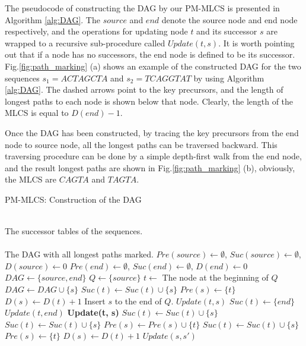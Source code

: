 \documentclass{article}
\begin{document}
The pseudocode of constructing the DAG by our PM-MLCS is presented in
Algorithm \ref{alg:DAG}. The $source$ and $end$ denote the source node
and end node respectively, and the operations for updating node $t$
and its successor $s$ are wrapped to a recursive sub-procedure called
$Update(t, s)$. It is worth pointing out that if a node has no
successors, the end node is defined to be its
successor. Fig.\ref{fig:path_marking} (a) shows an example of the
constructed DAG for the two sequences $s_1 = ACTAGCTA$ and $s_2 =
TCAGGTAT$ by using Algorithm \ref{alg:DAG}. The dashed arrows point to
the key precursors, and the length of longest paths to each node is
shown below that node. Clearly, the length of the MLCS is equal to
$D(end)-1$.

Once the DAG has been constructed, by tracing the key precursors from
the end node to source node, all the longest paths can be traversed
backward. This traversing procedure can be done by a simple
depth-first walk from the end node, and the result longest paths are
shown in Fig.\ref{fig:path_marking} (b), obviously, the MLCS are
$CAGTA$ and $TAGTA$.

\begin{algorithm}
  \caption{PM-MLCS: Construction of the DAG}\scriptsize
  \label{alg:DAG}
  \begin{algorithmic}[1]
    \REQUIRE ~~\\
    The successor tables of the sequences.\\
    \ENSURE ~~\\
    The DAG with all longest paths marked.
    \STATE
    \STATE $Pre(source) \leftarrow \emptyset$, $Suc(source)
    \leftarrow \emptyset$, $D(source) \leftarrow 0$
    \STATE $Pre(end) \leftarrow \emptyset$, $Suc(end)
    \leftarrow \emptyset$, $D(end) \leftarrow 0$
    \STATE $DAG \leftarrow \{source, end\}$
    \STATE $Q \leftarrow \{source\}$
    \STATE
    \STATE $t \leftarrow $ The node at the beginning of $Q$
    \STATE $DAG \leftarrow DAG \cup \{s\}$
    \STATE $Suc(t) \leftarrow Suc(t) \cup \{s\}$
    \STATE $Pre(s) \leftarrow \{t\}$
    \STATE $D(s) \leftarrow D(t) + 1$
    \STATE Insert $s$ to the end of $Q$.
    \ELSE
    \STATE $Update(t, s)$ 
    \ENDIF
    \ENDFOR
    \STATE $Suc(t) \leftarrow \{end\}$
    \STATE $Update(t, end)$
    \ENDIF 
    \ENDWHILE
    \STATE
    \STATE \textbf{Update(t, s)}
    \STATE
    \STATE $Suc(t) \leftarrow Suc(t) \cup \{s\}$
    \STATE $Suc(t) \leftarrow Suc(t) \cup \{s\}$
    \STATE $Pre(s) \leftarrow Pre(s) \cup \{t\}$
    \ELSE
    \STATE $Suc(t) \leftarrow Suc(t) \cup \{s\}$
    \STATE $Pre(s) \leftarrow \{t\}$
    \STATE $D(s) \leftarrow D(t) + 1$
    \STATE $Update(s, s')$
    \ENDFOR
    \ENDIF
    
  \end{algorithmic}
\end{algorithm}
\end{document}
